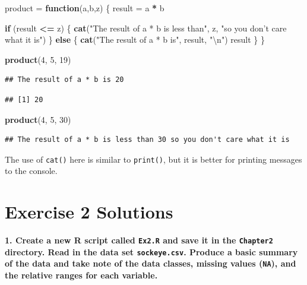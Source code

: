 \documentclass[]{book}
\newenvironment{Shaded}{\begin{snugshade}}{\end{snugshade}}
\newcommand{\KeywordTok}[1]{\textcolor[rgb]{0.13,0.29,0.53}{\textbf{#1}}}
\newcommand{\DecValTok}[1]{\textcolor[rgb]{0.00,0.00,0.81}{#1}}
\newcommand{\CharTok}[1]{\textcolor[rgb]{0.31,0.60,0.02}{#1}}
\newcommand{\StringTok}[1]{\textcolor[rgb]{0.31,0.60,0.02}{#1}}
\newcommand{\ControlFlowTok}[1]{\textcolor[rgb]{0.13,0.29,0.53}{\textbf{#1}}}
\newcommand{\OperatorTok}[1]{\textcolor[rgb]{0.81,0.36,0.00}{\textbf{#1}}}
\newcommand{\NormalTok}[1]{#1}
\theoremstyle{definition}
\theoremstyle{definition}
\theoremstyle{definition}
\theoremstyle{remark}
\begin{document}
\begin{Shaded}
\begin{Highlighting}[]
\NormalTok{product =}\StringTok{ }\ControlFlowTok{function}\NormalTok{(a,b,z) \{}
\NormalTok{  result =}\StringTok{ }\NormalTok{a }\OperatorTok{*}\StringTok{ }\NormalTok{b}
  
  \ControlFlowTok{if}\NormalTok{ (result }\OperatorTok{<=}\StringTok{ }\NormalTok{z) \{}
    \KeywordTok{cat}\NormalTok{(}\StringTok{"The result of a * b is less than"}\NormalTok{, z, }\StringTok{"so you don't care what it is"}\NormalTok{)}
\NormalTok{  \} }\ControlFlowTok{else}\NormalTok{ \{}
    \KeywordTok{cat}\NormalTok{(}\StringTok{"The result of a * b is"}\NormalTok{, result, }\StringTok{"}\CharTok{\textbackslash{}n}\StringTok{"}\NormalTok{)}
\NormalTok{    result}
\NormalTok{  \}}
\NormalTok{\}}

\KeywordTok{product}\NormalTok{(}\DecValTok{4}\NormalTok{, }\DecValTok{5}\NormalTok{, }\DecValTok{19}\NormalTok{)}
\end{Highlighting}
\end{Shaded}

\begin{verbatim}
## The result of a * b is 20
\end{verbatim}

\begin{verbatim}
## [1] 20
\end{verbatim}

\begin{Shaded}
\begin{Highlighting}[]
\KeywordTok{product}\NormalTok{(}\DecValTok{4}\NormalTok{, }\DecValTok{5}\NormalTok{, }\DecValTok{30}\NormalTok{)}
\end{Highlighting}
\end{Shaded}

\begin{verbatim}
## The result of a * b is less than 30 so you don't care what it is
\end{verbatim}

The use of \texttt{cat()} here is similar to \texttt{print()}, but it is
better for printing messages to the console.

\hypertarget{ex2-answers}{\section*{Exercise 2
Solutions}\label{ex2-answers}}

\textbf{1. Create a new R script called \texttt{Ex2.R} and save it in
the \texttt{Chapter2} directory. Read in the data set
\texttt{sockeye.csv}. Produce a basic summary of the data and take note
of the data classes, missing values (\texttt{NA}), and the relative
ranges for each variable.}
\end{document}
